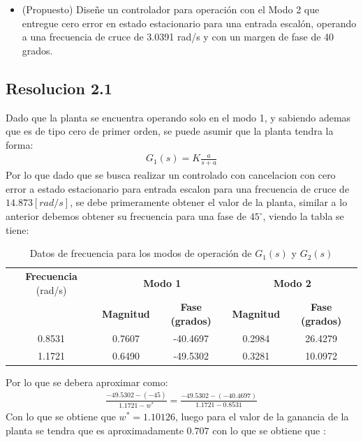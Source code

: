 \documentclass[
  11pt,
  letterpaper,
   addpoints,
   answers
  ]{exam}
\begin{document}
\begin{questions}
\begin{enumerate}
\begin{itemize}
            \item (Propuesto) Diseñe un controlador para operación con el Modo 2 que entregue cero error en estado estacionario para una entrada escalón, operando a una frecuencia de cruce de 3.0391 rad/s y con un margen de fase de 40 grados.
        \end{itemize}
    \end{enumerate}
    
\begin{solution}
\subsection*{Resolucion 2.1}
    Dado que la planta se encuentra operando solo en el modo 1, y sabiendo ademas que es de tipo cero de primer orden, se puede asumir que la planta tendra la forma:
    \begin{align}
        G_{1}(s) = K\frac{a}{s+a}
    \end{align}
    Por lo que dado que se busca realizar un controlado con cancelacion con cero error a estado estacionario para entrada escalon para una frecuencia de cruce de $14.873 [rad/s]$, se debe primeramente obtener el valor de la planta, similar a lo anterior debemos obtener su frecuencia para una fase de $45^{\circ}$, viendo la tabla se tiene:
    \begin{table}[H]
        \centering
        \footnotesize
        \begin{tabular}{|c|c|c|c|c|}
        \hline
        \textbf{Frecuencia} (rad/s) & \multicolumn{2}{c|}{\textbf{Modo 1}} & \multicolumn{2}{c|}{\textbf{Modo 2}} \\
        \cline{2-5}
        & \textbf{Magnitud} & \textbf{Fase (grados)} & \textbf{Magnitud} & \textbf{Fase (grados)} \\
        \hline
        0.8531 & 0.7607 & -40.4697 & 0.2984 & 26.4279 \\
        1.1721 & 0.6490 & -49.5302 & 0.3281 & 10.0972 \\
        \hline
        \end{tabular}
        \caption{Datos de frecuencia para los modos de operación de $G_1(s)$ y $G_2(s)$}
    \end{table}
    Por lo que se debera aproximar como:
    \begin{align}
        \frac{-49.5302 - (-45)}{1.1721 - w^{*}} = \frac{-49.5302 - (-40.4697)}{1.1721-0.8531} 
    \end{align}
Con lo que se obtiene que $w^{*}=1.10126$, luego para el valor de la ganancia de la planta se tendra que es aproximadamente $0.707$ con lo que se obtiene que :

\end{solution}
\end{questions}
\end{document}
